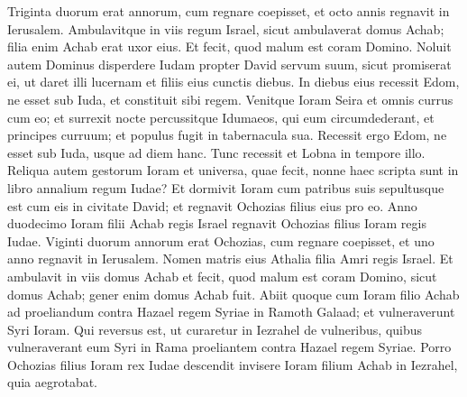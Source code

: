 \begin{biblechapter}
\begin{biblechapter}
\begin{biblechapter}
\begin{biblechapter}
\begin{biblechapter}
\begin{biblechapter}
\begin{biblechapter}
\begin{biblechapter}
\verse Triginta duorum erat annorum, cum regnare coepisset, et octo annis regnavit in Ierusalem. 
\verse Ambulavitque in viis regum Israel, sicut ambulaverat domus Achab; filia enim Achab erat uxor eius. Et fecit, quod malum est coram Domino. 
\verse Noluit autem Dominus disperdere Iudam propter David servum suum, sicut promiserat ei, ut daret illi lucernam et filiis eius cunctis diebus.
 \verse In diebus eius recessit Edom, ne esset sub Iuda, et constituit sibi regem. 
 \verse Venitque Ioram Seira et omnis currus cum eo; et surrexit nocte percussitque Idumaeos, qui eum circumdederant, et principes curruum; et populus fugit in tabernacula sua. 
\verse Recessit ergo Edom, ne esset sub Iuda, usque ad diem hanc. Tunc recessit et Lobna in tempore illo.
 \verse Reliqua autem gestorum Ioram et universa, quae fecit, nonne haec scripta sunt in libro annalium regum Iudae? 
\verse Et dormivit Ioram cum patribus suis sepultusque est cum eis in civitate David; et regnavit Ochozias filius eius pro eo.
 \verse Anno duodecimo Ioram filii Achab regis Israel regnavit Ochozias filius Ioram regis Iudae. 
\verse Viginti duorum annorum erat Ochozias, cum regnare coepisset, et uno anno regnavit in Ierusalem. Nomen matris eius Athalia filia Amri regis Israel. 
\verse Et ambulavit in viis domus Achab et fecit, quod malum est coram Domino, sicut domus Achab; gener enim domus Achab fuit.
 \verse Abiit quoque cum Ioram filio Achab ad proeliandum contra Hazael regem Syriae in Ramoth Galaad; et vulneraverunt Syri Ioram. 
\verse Qui reversus est, ut curaretur in Iezrahel de vulneribus, quibus vulneraverant eum Syri in Rama proeliantem contra Hazael regem Syriae. Porro Ochozias filius Ioram rex Iudae descendit invisere Ioram filium Achab in Iezrahel, quia aegrotabat.
 

\end{biblechapter}
\end{biblechapter}
\end{biblechapter}
\end{biblechapter}
\end{biblechapter}
\end{biblechapter}
\end{biblechapter}
\end{biblechapter}
